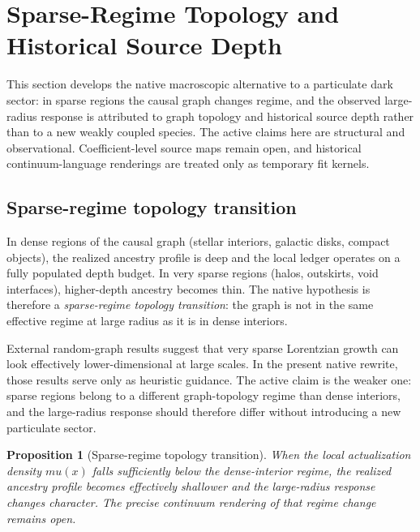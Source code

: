 \documentclass[11pt]{article}
\def\mu{mu}%
\newtheorem{proposition}{Proposition}
\begin{document}
\section{Sparse-Regime Topology and Historical Source Depth}
\label{sec:darkmatter}

This section develops the native macroscopic alternative to a particulate dark sector: in sparse regions the causal graph changes regime, and the observed large-radius response is attributed to graph topology and historical source depth rather than to a new weakly coupled species. The active claims here are structural and observational. Coefficient-level source maps remain open, and historical continuum-language renderings are treated only as temporary fit kernels.

\subsection{Sparse-regime topology transition}
\label{sec:dim_reduction}

In dense regions of the causal graph (stellar interiors, galactic disks, compact objects), the realized ancestry profile is deep and the local ledger operates on a fully populated depth budget. In very sparse regions (halos, outskirts, void interfaces), higher-depth ancestry becomes thin. The native hypothesis is therefore a \emph{sparse-regime topology transition}: the graph is not in the same effective regime at large radius as it is in dense interiors.

External random-graph results suggest that very sparse Lorentzian growth can look effectively lower-dimensional at large scales. In the present native rewrite, those results serve only as heuristic guidance. The active claim is the weaker one: sparse regions belong to a different graph-topology regime than dense interiors, and the large-radius response should therefore differ without introducing a new particulate sector.

\begin{proposition}[Sparse-regime topology transition]
\label{prop:dim_reduction}
When the local actualization density $\mu(x)$ falls sufficiently below the dense-interior regime, the realized ancestry profile becomes effectively shallower and the large-radius response changes character. The precise continuum rendering of that regime change remains open.
\end{proposition}
\end{document}
